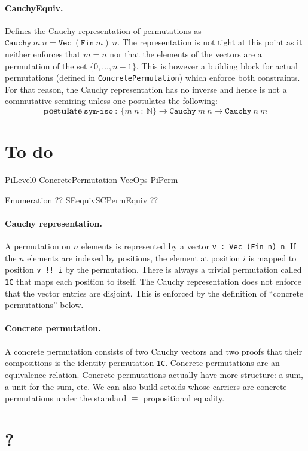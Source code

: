 \documentclass{article}
\begin{document}
\paragraph*{CauchyEquiv.} Defines the Cauchy representation of
permutations as
$\texttt{Cauchy}~m~n = \texttt{Vec}~(\texttt{Fin}~m)~n$. The
representation is not tight at this point as it neither enforces that
$m=n$ nor that the elements of the vectors are a permutation of the
set $\{0,\ldots,n-1\}$. This is however a building block for actual
permutations (defined in \texttt{ConcretePermutation}) which enforce
both constraints. For that reason, the Cauchy representation has no
inverse and hence is not a commutative semiring unless one postulates
the following:
\[
\textbf{postulate}~\texttt{sym-iso}~:~\{m~n~:~\mathbb{N}\} \rightarrow
  \texttt{Cauchy}~m~n \rightarrow \texttt{Cauchy}~n~m
\]

\section{To do}

PiLevel0
ConcretePermutation
VecOps
PiPerm

Enumeration ??
SEequivSCPermEquiv ??


\paragraph*{Cauchy representation.} A permutation on $n$ elements is represented by a vector \texttt{v : Vec (Fin n) n}. If the $n$ elements are indexed by positions, the element at position $i$ is mapped to position \texttt{v !! i} by the permutation. There is always a trivial permutation called \texttt{1C} that maps each position to itself. The Cauchy representation does not enforce that the vector entries are disjoint. This is enforced by the definition of ``concrete permutations'' below. 

\paragraph*{Concrete permutation.} A concrete permutation consists of two Cauchy vectors and two proofs that their compositions is the identity permutation \texttt{1C}. Concrete permutations are an equivalence relation. Concrete permutations actually have more structure: a sum, a unit for the sum, etc. We can also build setoids whose carriers are concrete permutations under the standard $\equiv$ propositional equality.

\section{?}


\end{document}
